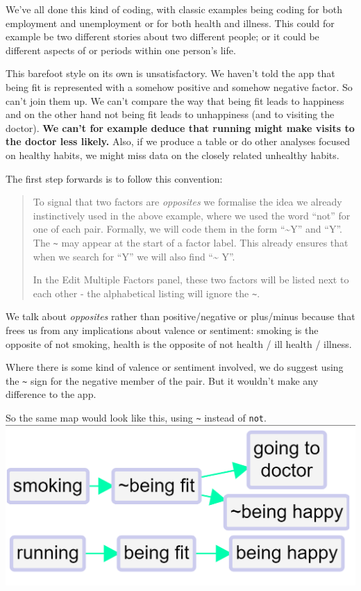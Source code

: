 \documentclass[
]{book}
\begin{document}
We've all done this kind of coding, with classic examples being coding for both employment and unemployment or for both health and illness. This could for example be two different stories about two different people; or it could be different aspects of or periods within one person's life.

This barefoot style on its own is unsatisfactory. We haven't told the app that being fit is represented with a somehow positive and somehow negative factor. So can't join them up. We can't compare the way that being fit leads to happiness and on the other hand not being fit leads to unhappiness (and to visiting the doctor). \textbf{We can't for example deduce that running might make visits to the doctor less likely.} Also, if we produce a table or do other analyses focused on healthy habits, we might miss data on the closely related unhealthy habits.

The first step forwards is to follow this convention:

\begin{quote}
To signal that two factors are \emph{opposites} we formalise the idea we already instinctively used in the above example, where we used the word ``not'' for one of each pair. Formally, we will code them in the form ``\textasciitilde Y'' and ``Y''. The \texttt{\textasciitilde{}} may appear at the start of a factor label. This already ensures that when we search for ``Y'' we will also find ``\textasciitilde{} Y''.

In the Edit Multiple Factors panel, these two factors will be listed next to each other - the alphabetical listing will ignore the \texttt{\textasciitilde{}}.
\end{quote}

We talk about \emph{opposites} rather than positive/negative or plus/minus because that frees us from any implications about valence or sentiment: smoking is the opposite of not smoking, health is the opposite of not health / ill health / illness.

Where there is some kind of valence or sentiment involved, we do suggest using the \texttt{\textasciitilde{}} sign for the negative member of the pair. But it wouldn't make any difference to the app.

So the same map would look like this, using \texttt{\textasciitilde{}} instead of \texttt{not}.
\includegraphics{_assets/121007.png}
\end{document}
